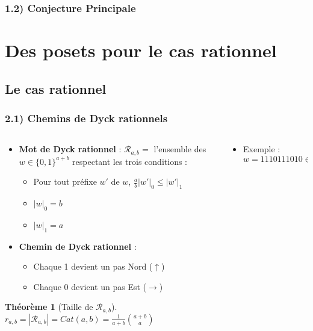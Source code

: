 \documentclass{beamer}
\newtheorem*{thm}{Théorème}
\begin{document}
\begin{frame} %
    \frametitle{1.2) Conjecture Principale}
\end{frame}

\section{Des posets pour le cas rationnel} %

\subsection{Le cas rationnel}

\begin{frame} %
    \frametitle{2.1) Chemins de Dyck rationnels}
    \begin{columns}
        \begin{column}{0.65\textwidth}
            \begin{itemize}
                \item \textbf{Mot de Dyck rationnel} : $\mathcal{R}_{a,b} =$
                    l'ensemble des $w \in \{0,1\}^{a+b}$ respectant les trois
                    conditions :
                \begin{itemize}
                    \item Pour tout préfixe $w'$ de $w$, $\frac{a}{b}|w'|_0
                     \leqslant |w'|_1$
                     \item $|w|_0 = b$
                     \item $|w|_1 = a$
                \end{itemize}
                \item \textbf{Chemin de Dyck rationnel} :
                \begin{itemize}
                    \item Chaque 1 devient un pas Nord ($\uparrow$)
                    \item Chaque 0 devient un pas Est ($\rightarrow$)
                \end{itemize}
            \end{itemize}

            \begin{thm} [Taille de $\mathcal{R}_{a,b}$]           
                $\displaystyle r_{a,b} = |\mathcal{R}_{a,b}|
                = Cat(a,b) = \frac{1}{a+b}\binom{a+b}{a}$
            \end{thm}

        \end{column}
        \begin{column}{0.35\textwidth}
            \begin{itemize}
                \item Exemple : $w = 1110111010 \in \mathcal{R}_{7,3}$
            \end{itemize}
            
        \end{column}
    \end{columns}
\end{frame}
\end{document}
